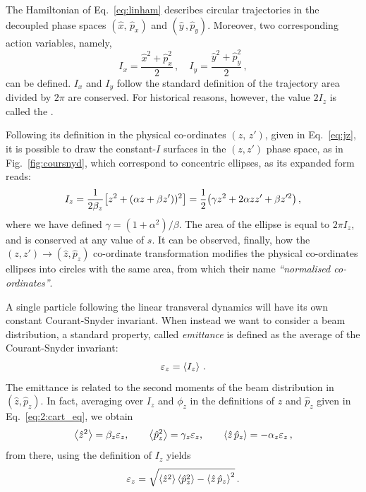 The Hamiltonian of Eq.~\eqref{eq:linham} describes circular trajectories in the decoupled phase spaces $(\hat x,\,\hat p_x)$ and $(\hat y\,, \hat p_y)$. Moreover, two corresponding action variables, namely,
\begin{equation}
    I_x = \frac{\hat x^2 +\hat p_x^2}{2}\,, \quad I_y=\frac{\hat y^2+\hat p_y^2}{2} \,,
\end{equation}
can be defined. $I_x$ and $I_y$ follow the standard definition of the trajectory area divided by $2\pi$ are conserved. For historical reasons, however, the value $2I_z$ is called the .

Following its definition in the physical co-ordinates $(z,\, z')$, given in Eq.~\eqref{eq:jz}, it is possible to draw the constant-$I$ surfaces in the $(z,z')$ phase space, as in Fig.~\ref{fig:coursnyd}, which correspond to concentric ellipses, as its expanded form reads:
%
\begin{equation}
I_z = \frac{1}{2\beta_z}\qty[z^2 + (\alpha z + \beta z'))^2] = \frac{1}{2}\qty(\gamma z^2 + 2\alpha z z' + \beta z'^2)\,, \end{equation}
%
where we have defined $\gamma=(1+\alpha^2)/\beta$. The area of the ellipse is equal to $2\pi I_z$, and is conserved at any value of $s$. It can be observed, finally, how the $(z,z')\to(\hat z,\hat p_z)$ co-ordinate transformation modifies the physical co-ordinates ellipses into circles with the same area, from which their name \textit{``normalised co-ordinates''}.

A single particle following the linear transveral dynamics will have its own constant Courant-Snyder invariant. When instead we want to consider a beam distribution, a standard property, called \textit{emittance} is defined as the average of the Courant-Snyder invariant:
\begin{equation}
    \varepsilon_z = \left<{I_z}\right> \,.
\end{equation}
The emittance is related to the second moments of the beam distribution in $(\hat z,\hat p_z)$. In fact, averaging over $I_z$ and $\phi_z$ in the definitions of $\hat z$ and $\hat p_z$ given in Eq.~\eqref{eq:2:cart_eq}, we obtain
%
\begin{equation}
	\left<{\hat z^2}\right> = \beta_z \varepsilon_z, \qquad \left<{\hat p_z^2}\right>=\gamma_z \varepsilon_z, \qquad \left<{\hat z\,\hat p_z}\right>=-\alpha_z\varepsilon_z\,,
\end{equation}
%
from there, using the definition of $I_z$ yields
\begin{equation}
	\varepsilon_z = \sqrt{ \left<{\hat z^2}\right>\left<{\hat p_z^2}\right> - \left<{\hat z \, \hat p_z}\right>^2 }\,.
\end{equation}

